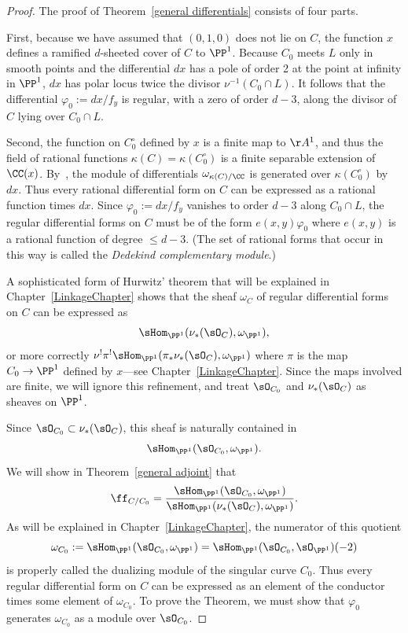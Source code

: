 \begin{proof}
The proof of Theorem~\ref{general differentials} consists of four parts. 

First, because we have assumed that $(0,1,0)$ does not lie on $C$, the function $x$ defines a
ramified $d$-sheeted cover of $C$ to $\PP^{1}$. Because $C_{0}$ meets $L$ only in smooth
points and the differential $dx$ has a pole of order 2 at the point at infinity in $\PP^{1}$,
$dx$
has polar locus twice the divisor $ \nu^{-1}(C_{0}\cap L)$. It follows that
the differential
$\varphi_0 := dx/f_{y}$ is regular, with a zero of order $d-3$,
along the divisor of $C$ lying over $C_0\cap L$.

Second, the function on $C^\circ_0$ defined by $x$  
is a finite map to $\AA^1$, and thus the field of rational functions $\kappa(C) = \kappa(C^\circ_0)$ is a finite
separable extension of $\CC(x)$. By~\cite[Section 16.5]{Eisenbud1995}, the module of differentials 
$\omega_{\kappa(C)/\CC}$ is generated over $\kappa(C^\circ_0)$ by $dx$. Thus every rational
differential form on $C$ can be expressed as a rational function
times $dx$. Since $\varphi_{0} := dx/f_{y}$ vanishes to order $d-3$ along $C_{0}\cap L$,
the regular differential forms on $C$ must be of the form $e(x,y)\varphi_{0}$ where
$e(x,y)$ is a rational function of degree $\leq d-3$. (The set of rational forms that occur in this
way is called the \emph{Dedekind complementary module}.)
 
A sophisticated form of Hurwitz' theorem that will be explained in Chapter~\ref{LinkageChapter}
shows that the sheaf $\omega_{C}$ of regular differential forms on $C$ can be expressed as
$$
\sHom_{\PP^{1}}(\nu_{*}(\sO_{C}), \omega_{\PP^{1}}),
$$
or more correctly $\nu^{!}\pi^{!}\sHom_{\PP^{1}}(\pi_{*}\nu_{*}(\sO_{C}), \omega_{\PP^{1}})$
where $\pi$ is the map $C_{0}\to \PP^{1}$ defined by $x$---see Chapter~\ref{LinkageChapter}. Since the maps involved are finite,
we will ignore this refinement, and treat $\sO_{C_{0}}$ and $\nu_{*}(\sO_{C})$ as sheaves on $\PP^{1}$.

Since $\sO_{C_{0}}\subset \nu_{*}(\sO_{C})$, this sheaf is naturally contained
in 
$$
\sHom_{\PP^{1}}(\sO_{C_{0}}, \omega_{\PP^{1}}).
$$
We will show in Theorem~\ref{general adjoint} that 
$$
\ff_{C/C_{0}} = 
\frac{\sHom_{\PP^{1}}(\sO_{C_{0}}, \omega_{\PP^{1}})}
{\sHom_{\PP^{1}}(\nu_{*}(\sO_{C}), \omega_{\PP^{1}})}.
$$
As will be explained in Chapter~\ref{LinkageChapter}, the numerator of this quotient
$$
\omega_{C_{0}}:= \sHom_{\PP^{1}}(\sO_{C_{0}}, \omega_{\PP^{1}}) = 
\sHom_{\PP^{1}}(\sO_{C_{0}}, \sO_{\PP^{1}})(-2)
$$
 is properly called the dualizing module  of the singular curve $C_{0}$.
Thus every regular differential form on $C$ can be expressed as an element of the conductor
times some element of $\omega_{C_{0}}$. To prove the Theorem, we must show that
$\varphi_{0}$ generates $\omega_{C_{0}}$ as a module over $\sO_{C_{0}}$.


\end{proof}
